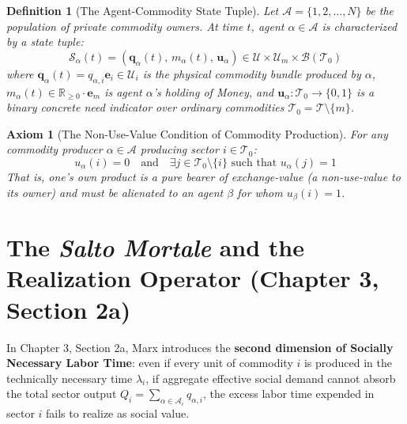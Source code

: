 \documentclass[11pt,a4paper]{article}
\newtheorem{axiom}{Axiom}[section]
\newtheorem{definition}{Definition}[section]
\begin{document}
\begin{definition}[The Agent-Commodity State Tuple]
Let $\mathcal{A} = \{1, 2, \dots, N\}$ be the population of private commodity owners. At time $t$, agent $\alpha \in \mathcal{A}$ is characterized by a state tuple:
\begin{equation}
    \mathcal{S}_\alpha(t) = \left( \mathbf{q}_\alpha(t), \, m_\alpha(t), \, \mathbf{u}_\alpha \right) \in \mathcal{U} \times \mathcal{U}_m \times \mathcal{B}(\mathcal{T}_0)
\end{equation}
where $\mathbf{q}_\alpha(t) = q_{\alpha, i} \mathbf{e}_i \in \mathcal{U}_i$ is the physical commodity bundle produced by $\alpha$, $m_\alpha(t) \in \mathbb{R}_{\ge 0} \cdot \mathbf{e}_m$ is agent $\alpha$'s holding of Money, and $\mathbf{u}_\alpha: \mathcal{T}_0 \to \{0, 1\}$ is a binary concrete need indicator over ordinary commodities $\mathcal{T}_0 = \mathcal{T} \setminus \{m\}$.
\end{definition}

\begin{axiom}[The Non-Use-Value Condition of Commodity Production]
For any commodity producer $\alpha \in \mathcal{A}$ producing sector $i \in \mathcal{T}_0$:
\begin{equation}
    u_\alpha(i) = 0 \quad \text{and} \quad \exists j \in \mathcal{T}_0 \setminus \{i\} \text{ such that } u_\alpha(j) = 1
\end{equation}
That is, one's own product is a pure bearer of exchange-value (a non-use-value to its owner) and must be alienated to an agent $\beta$ for whom $u_\beta(i) = 1$.
\end{axiom}

\section{The \textit{Salto Mortale} and the Realization Operator (Chapter 3, Section 2a)}

In Chapter 3, Section 2a, Marx introduces the \textbf{second dimension of Socially Necessary Labor Time}: even if every unit of commodity $i$ is produced in the technically necessary time $\lambda_i$, if aggregate effective social demand cannot absorb the total sector output $Q_i = \sum_{\alpha \in \mathcal{A}_i} q_{\alpha, i}$, the excess labor time expended in sector $i$ fails to realize as social value.
\end{document}
